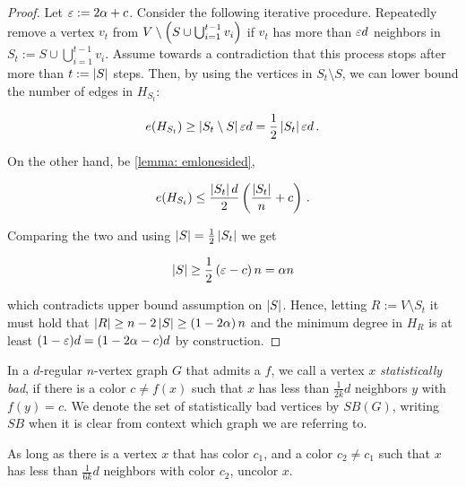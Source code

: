 \begin{proof}
    Let $\varepsilon:=2\alpha + c$. Consider the following iterative procedure. Repeatedly remove a vertex $v_t$ from $V\setminus \left(S \cup \bigcup_{i=1}^{t-1} v_i\right)$ if $v_t$ has more than $\varepsilon d$ neighbors in $S_t := S \cup \bigcup_{i=1}^{t-1} v_i$. Assume towards a contradiction that this process stops after more than $t:=\left\lvert S\right\rvert$ steps. Then, by using the vertices in $S_t\setminus S$, we can lower bound the number of edges in $H_{S_t}$:

    $$e(H_{S_t})\geq \left\lvert S_t\setminus S\right\rvert \varepsilon d= \frac{1}{2}\left\lvert S_t\right\rvert\varepsilon d\,.$$

    On the other hand, be \cref{lemma: emlonesided},

    $$e(H_{S_t})\leq \frac{\left\lvert S_t\right\rvert d}{2}\left(\frac{\left\lvert S_t\right\rvert}{n} + c\right)\,.$$

    Comparing the two and using $\left\lvert S\right\rvert=\frac{1}{2}\left\lvert S_t\right\rvert$ we get

    $$\left\lvert S\right\rvert\geq\frac{1}{2}\left(\varepsilon-c\right)n=\alpha n$$

    which contradicts upper bound assumption on $\left\lvert S\right\rvert$. Hence, letting $R:=V\setminus S_t$ it must hold that $\left\lvert R\right\rvert\geq n-2\left\lvert S\right\rvert\geq \left(1-2\alpha\right)n$ and the minimum degree in $H_R$ is at least $(1-\varepsilon)d=(1-2\alpha-c)d$ by construction.
\end{proof}

\begin{definition}\label{def: statisticallybad}
    In a $d$-regular $n$-vertex graph $G$ that admits a \kcl $f$, we call a vertex $x$ \textit{statistically bad}, if there is a color $c\neq f(x)$ such that $x$ has less than $\frac{1}{2k}d$ neighbors $y$ with $f(y)=c$. We denote the set of statistically bad vertices by $SB(G)$, writing $SB$ when it is clear from context which graph we are referring to.
\end{definition}


\begin{algorithm}[H]
    As long as there is a vertex $x$ that has color $c_1$, and a color $c_2\neq c_1$ such that $x$ has less than $\frac{1}{6k}d$ neighbors with color $c_2$, uncolor $x$.
    \protect\caption{\label{alg: uncoloring}Uncoloring Algorithm}
\end{algorithm}


